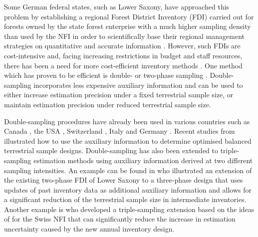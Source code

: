\documentclass[remotesensing,article,accept,moreauthors,pdftex,10pt,a4paper]{Definitions/mdpi}
\begin{document}
Some German federal states, such as Lower Saxony, have approached this problem by establishing a regional Forest District Inventory (FDI) carried out for forests owned by the state forest enterprise with a much higher sampling density than used by the NFI in order to scientifically base their regional management strategies on quantitative and accurate information \citep{bockmann1998}. However, such FDIs are cost-intensive and, facing increasing restrictions in budget and staff resources, there has been a need for more cost-efficient inventory methods \citep{vonLuepke2012, vonluepke2013}. One method which has proven to be efficient is double- or two-phase sampling \citep{devries1986, cochran1977, sarndal2003, gregoire2007, kohl2006, mandallaz2008}. Double-sampling incorporates less expensive auxiliary information and can be used to either increase estimation precision under a fixed terrestrial sample size, or maintain estimation precision under reduced terrestrial sample size. 

Double-sampling procedures have already been used in various countries such as Canada \citep{gillis2010intomppo}, the USA \citep{chojnacky1998}, Switzerland \citep{lanz2010intomppo}, Italy \citep{gasparini2010intomppo} and Germany \citep{saborowski2010}. Recent studies \mbox{from \citet{grafstrom2017a}} illustrated how to use the auxiliary information to determine optimised balanced terrestrial sample designs. Double-sampling has also been extended to triple-sampling estimation methods using auxiliary information derived at two different sampling intensities. An example can be found in \citet{vonLuepke2012} who illustrated an extension of the existing two-phase FDI of Lower Saxony to a three-phase design that uses updates of past inventory data as additional auxiliary information and allows for a significant reduction of the terrestrial sample size in intermediate inventories. Another example is \citet{massey2014a} who developed a triple-sampling extension based on the ideas of \citet{mandallaz2013c} for the Swiss NFI that can significantly reduce the increase in estimation uncertainty caused by the new annual inventory design.\par
\end{document}
